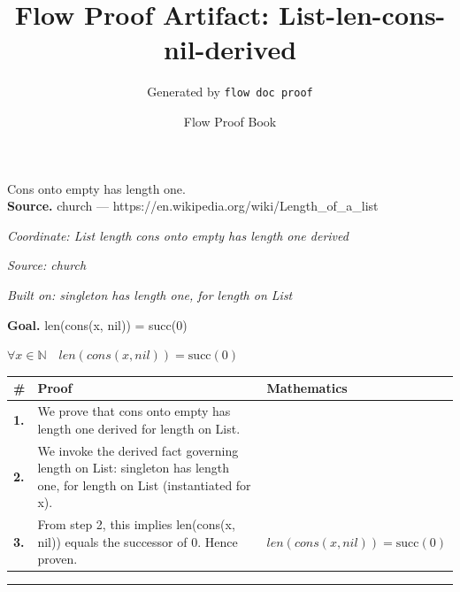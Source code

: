 \documentclass[11pt]{article}
\title{Flow Proof Artifact: List-len-cons-nil-derived}
\author{Generated by \texttt{flow doc proof}}
\date{Flow Proof Book}
\theoremstyle{definition}
\begin{document}
\maketitle
Cons onto empty has length one.\\[0.5em]
\textbf{Source.} church — https://en.wikipedia.org/wiki/Length\_of\_a\_list\\[0.5em]
\bigskip
{}\par
\smallskip\noindent\textit{Coordinate: List \cdot length \cdot cons onto empty has length one derived}\par
\smallskip\noindent\textit{Source: church}\par
\smallskip\noindent\textit{Built on: singleton has length one, for length on List}\par
\medskip
\noindent\textbf{Goal.} len(cons(x, nil)) = succ(0)\par
\noindent$\displaystyle \forall x \in \mathbb{N}\quad len(cons(x, nil)) = \mathrm{succ}(0)$\par
\medskip
\noindent
\begin{tabular}{@{} >{\raggedright\arraybackslash}p{} >{\raggedright\arraybackslash}p{} >{\raggedleft\arraybackslash}p{} @{}}
\textbf{\#} & \textbf{Proof} & \textbf{Mathematics} \\
\midrule
\textbf{1.} & We prove that cons onto empty has length one derived for length on List. & \\[0.45em]
\textbf{2.} & We invoke the derived fact governing length on List: singleton has length one, for length on List (instantiated for x). & \\[0.45em]
\textbf{3.} & From step 2, this implies len(cons(x, nil)) equals the successor of 0. Hence proven. & $\displaystyle len(cons(x, nil)) = \mathrm{succ}(0)$ \\[0.45em]
\bottomrule
\end{tabular}
\label{thm:List-length-cons_onto_empty_has_length_one_derived}
\par\medskip\hrule
\end{document}
